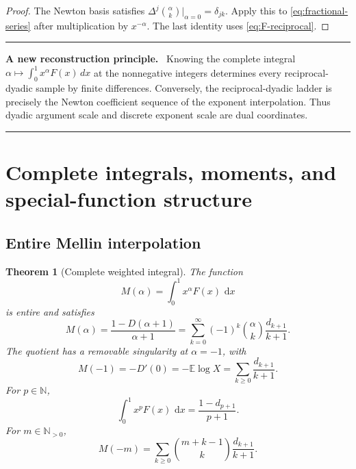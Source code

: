 \documentclass[11pt,oneside]{article}
\numberwithin{equation}{section}
\newtheorem{theorem}{Theorem}[section]
\theoremstyle{definition}
\theoremstyle{remark}
\newcommand{\N}{\mathbb N}
\newcommand{\E}{\mathbb E}
\newcommand{\dd}{\,\mathrm d}
\newenvironment{resultbox}[1]{%
  \par\medskip\noindent\begin{center}\begin{minipage}{0.94\textwidth}%
  \color{deepgreen}\hrule\vspace{0.62em}%
  \color{black}\textbf{\color{deepgreen}#1.}\ }{%
  \par\vspace{0.62em}\color{deepgreen}\hrule
  \end{minipage}\end{center}\medskip}
\begin{document}
\begin{proof}
The Newton basis satisfies $\Delta^j\binom\alpha k|_{\alpha=0}=\delta_{jk}$.  Apply this to
\eqref{eq:fractional-series} after multiplication by $x^{-\alpha}$.  The last identity uses
\eqref{eq:F-reciprocal}.
\end{proof}

\begin{resultbox}{A new reconstruction principle}
Knowing the complete integral $\alpha\mapsto\int_0^1x^\alpha F(x)\,dx$ at the nonnegative
integers determines every reciprocal-dyadic sample by finite differences.  Conversely, the
reciprocal-dyadic ladder is precisely the Newton coefficient sequence of the exponent
interpolation.  Thus dyadic argument scale and discrete exponent scale are dual coordinates.
\end{resultbox}

\section{Complete integrals, moments, and special-function structure}
\label{sec:complete}

\subsection{Entire Mellin interpolation}

\begin{theorem}[Complete weighted integral]
\label{thm:complete-M}
The function
\begin{equation}
 M(\alpha)=\int_0^1x^\alpha F(x)\,\dd x                       \label{eq:M-def}
\end{equation}
is entire and satisfies
\begin{equation}
 \boxed{
 M(\alpha)=\frac{1-D(\alpha+1)}{\alpha+1}
 =\sum_{k=0}^{\infty}(-1)^k\binom\alpha k\frac{d_{k+1}}{k+1}.}
 \label{eq:M-master}
\end{equation}
The quotient has a removable singularity at $\alpha=-1$, with
\begin{equation}
 M(-1)=-D'(0)=-\E\log X=\sum_{k\ge0}\frac{d_{k+1}}{k+1}.      \label{eq:M-minus-one}
\end{equation}
For $p\in\N$,
\begin{equation}
 \int_0^1x^pF(x)\,\dd x=\frac{1-d_{p+1}}{p+1}.               \label{eq:M-integer}
\end{equation}
For $m\in\N_{>0}$,
\begin{equation}
 M(-m)=\sum_{k\ge0}\binom{m+k-1}{k}\frac{d_{k+1}}{k+1}.      \label{eq:M-negative}
\end{equation}
\end{theorem}
\end{document}
